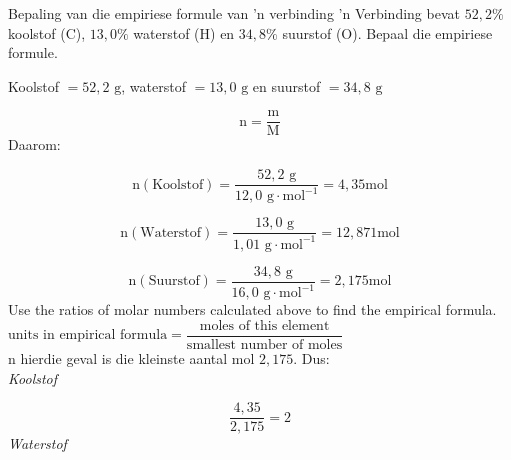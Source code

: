     \noindent
\label{m38712*secfhsst!!!underscore!!!id1029}
      \noindent 
      \begin{wex}{Bepaling van die empiriese formule van  'n verbinding}{
  'n Verbinding bevat $52,2\%$ koolstof ($\text{C}$), $13,0\%$ waterstof ($\text{H}$) en $34,8\%$ suurstof ($\text{O}$). Bepaal die empiriese formule.      
}
{ %
      \label{m38712*id280928}Koolstof $=52,2 \text{ g}$, waterstof $=13,0 \text{ g}$ en suurstof $=34,8 \text{ g}$ 
      \label{m38712*id280954}\nopagebreak\noindent{}
        
    \begin{equation*}
    \text{n}=\frac{\text{m}}{\text{M}}
      \end{equation*}
      \label{m38712*id280975}Daarom: 
      \label{m38712*id280978}\nopagebreak\noindent{}
        
    \begin{equation*}
    \text{n}\left(\text{Koolstof}\right)=\frac{52,2 \text{ g}}{12,0 \text{ g} \cdot \text{mol}^{-1}}=4,35\text{mol}
      \end{equation*}
      \label{m38712*id281042}\nopagebreak\noindent{}
        
    \begin{equation*}
    \text{n}\left(\text{Waterstof}\right)=\frac{13,0 \text{ g}}{1,01 \text{ g} \cdot \text{mol}^{-1}}=12,871\text{mol}
      \end{equation*}
      \label{m38712*id281111}\nopagebreak\noindent{}
        
    \begin{equation*}
    \text{n}\left(\text{Suurstof}\right)=\frac{34,8 \text{ g}}{16,0 \text{ g} \cdot \text{mol}^{-1}}=2,175\text{mol}
      \end{equation*}
Use the ratios of molar numbers calculated above to find the empirical formula.\newline \\
$\text{units in empirical formula} = \dfrac{\text{moles of this element}}{\text{smallest number of moles}}$\newline \\
n hierdie geval is die kleinste aantal mol $2,175$. Dus:\\ 
      \label{m38712*id281179}
        \textsl{Koolstof}
 
      \label{m38712*id281185}\nopagebreak\noindent{}
        
    \begin{equation*}
    \frac{4,35}{2,175}=2
      \end{equation*}
      \label{m38712*id281217}
        \textsl{Waterstof}
     
}
\end{wex}
